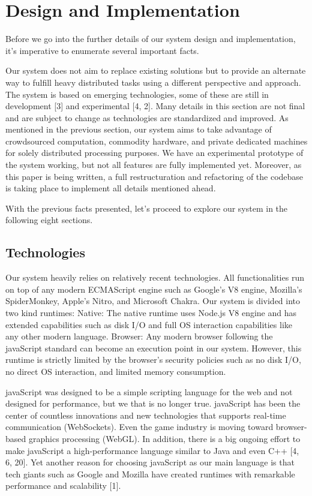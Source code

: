 \documentclass[10pt,reprint]{socc14}
\begin{document}
\section{Design and Implementation}

Before we go into the further details of our system design and implementation, it’s imperative to enumerate several important facts.

Our system does not aim to replace existing solutions but to provide an alternate way to fulfill heavy distributed tasks using a different perspective and approach.
The system is based on emerging technologies, some of these are still in development [3] and experimental [4, 2]. Many details in this section are not final and are subject to change as technologies are standardized and improved.
As mentioned in the previous section, our system aims to take advantage of crowdsourced computation, commodity hardware, and private dedicated machines for solely distributed processing purposes.
We have an experimental prototype of the system working, but not all features are fully implemented yet. Moreover, as this paper is being written, a full restructuration and refactoring of the codebase is taking place to implement all details mentioned ahead.

With the previous facts presented, let’s proceed to explore our system in the following eight sections.


\subsection{Technologies}
Our system heavily relies on relatively recent technologies. All functionalities run on top of any modern ECMAScript engine such as Google’s V8 engine,  Mozilla’s SpiderMonkey, Apple’s Nitro, and Microsoft Chakra. Our system is divided into two kind runtimes: 
Native: The native runtime uses Node.js V8 engine and has extended capabilities such as disk I/O and full OS interaction capabilities like any other modern language.
Browser: Any modern browser following the javaScript standard can become an execution point in our system. However, this runtime is strictly limited by the browser’s security policies such as no disk I/O, no direct OS interaction, and limited memory consumption.

javaScript was designed to be a simple scripting language for the web and not designed for performance, but we that is no longer true. javaScript has been the center of countless innovations and new technologies that supports real-time communication (WebSockets). Even the game industry is moving toward browser-based graphics processing (WebGL). In addition, there is a big ongoing effort to make javaScript a high-performance language similar to Java and even C++ [4, 6, 20]. Yet another reason for choosing javaScript as our main language is that tech giants such as Google and Mozilla have created runtimes with remarkable performance and scalability [1].
\end{document}
